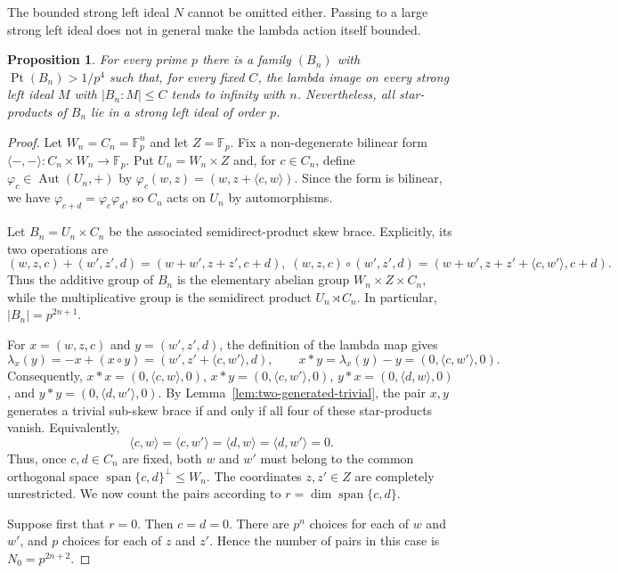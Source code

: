 \documentclass[10pt,a4paper]{amsart}
\numberwithin{equation}{section}
\newtheorem{pro}[equation]{Proposition}
\newcommand{\Pt}{\operatorname{Pt} }
\newcommand{\Aut}{\operatorname{Aut} }
\begin{document}
The bounded strong left ideal $N$ cannot be omitted either. Passing to
a large strong left ideal does not in general make the lambda action
itself bounded.

\begin{pro} %
For every prime $p$ there is a family $(B_n)$ with
$\Pt(B_n)>1/p^4$ such that, for every fixed $C$, the lambda image on
every strong left ideal $M$ with $|B_n:M|\leqslant C$ tends to infinity
with $n$. Nevertheless, all star-products of $B_n$ lie in a strong
left ideal of order $p$.
\end{pro}
\begin{proof}
Let $W_n=C_n=\mathbb F_p^n$ and let $Z=\mathbb F_p$. Fix a non-degenerate bilinear form
$\langle-,-\rangle:C_n\times W_n\to\mathbb F_p$. Put $U_n=W_n\times Z$ and, for $c\in C_n$, define
$\varphi_c\in\Aut(U_n,+)$ by
$\varphi_c(w,z)=(w,z+\langle c,w\rangle)$. Since the form is bilinear, we have
$\varphi_{c+d}=\varphi_c\varphi_d$, so $C_n$ acts on $U_n$ by automorphisms.

Let $B_n=U_n\times C_n$ be the associated semidirect-product skew brace. Explicitly, its two operations are
$$
(w,z,c)+(w',z',d)=(w+w',z+z',c+d),\;
(w,z,c)\circ(w',z',d)
=(w+w',z+z'+\langle c,w'\rangle,c+d).
$$
Thus the additive group of $B_n$ is the elementary abelian group
$W_n\times Z\times C_n$, while the multiplicative group is the semidirect product
$U_n\rtimes C_n$. In particular,
$|B_n|=p^{2n+1}$.

For $x=(w,z,c)$ and $y=(w',z',d)$, the definition of the lambda map gives
$$
\lambda_x(y)
=-x+(x\circ y)
=(w',z'+\langle c,w'\rangle,d),
\qquad
x*y=\lambda_x(y)-y=(0,\langle c,w'\rangle,0).
$$
Consequently,
$x*x=(0,\langle c,w\rangle,0)$,
$x*y=(0,\langle c,w'\rangle,0)$,
$y*x=(0,\langle d,w\rangle,0)$, and
$y*y=(0,\langle d,w'\rangle,0)$.
By Lemma~\ref{lem:two-generated-trivial}, the pair $x,y$ generates a trivial sub-skew brace if and only if all four of these star-products vanish. Equivalently,
$$
\langle c,w\rangle=\langle c,w'\rangle
=\langle d,w\rangle=\langle d,w'\rangle=0.
$$
Thus, once $c,d\in C_n$ are fixed, both $w$ and $w'$ must belong to the common orthogonal space
$\operatorname{span}\{c,d\}^{\perp}\leqslant W_n$. The coordinates $z,z'\in Z$ are completely unrestricted. We now count the pairs according to
$r=\dim\operatorname{span}\{c,d\}$.

Suppose first that $r=0$. Then $c=d=0$. There are $p^n$ choices for each of $w$ and $w'$, and $p$ choices for each of $z$ and $z'$. Hence the number of pairs in this case is
$N_0=p^{2n+2}$.


\end{proof}
\end{document}
